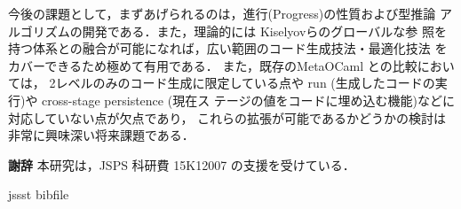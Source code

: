 \documentclass[T]{compsoft}
\theoremstyle{break}
\begin{document}
今後の課題として，まずあげられるのは，進行(Progress)の性質および型推論
アルゴリズムの開発である．また，理論的には Kiselyovらのグローバルな参
照を持つ体系との融合が可能になれば，広い範囲のコード生成技法・最適化技法
をカバーできるため極めて有用である．
また，既存のMetaOCaml との比較においては，
2レベルのみのコード生成に限定している点や
run (生成したコードの実行)や cross-stage persistence (現在ス
テージの値をコードに埋め込む機能)などに対応していない点が欠点であり，
これらの拡張が可能であるかどうかの検討は非常に興味深い将来課題である．

{\bf 謝辞} 本研究は，JSPS 科研費 15K12007 の支援を受けている．

 {jssst}
 {bibfile}
\end{document}
